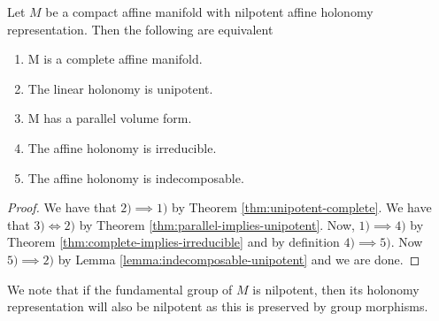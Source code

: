 \begin{theorem}
    \label{thm:complete-parallel-volume}
    Let $M$ be a compact affine manifold with nilpotent affine holonomy representation. Then the following are equivalent
    \begin{enumerate}
        \item M is a complete affine manifold.
        \item The linear holonomy is unipotent.
        \item M has a parallel volume form.
        \item The affine holonomy is irreducible.
        \item The affine holonomy is indecomposable.
    \end{enumerate}
\end{theorem}
\begin{proof}
    We have that $2) \implies 1)$ by Theorem \ref{thm:unipotent-complete}. We have that $3) \iff 2)$ by Theorem \ref{thm:parallel-implies-unipotent}.
    Now, $1) \implies 4)$ by Theorem \ref{thm:complete-implies-irreducible} and by definition $4) \implies 5)$. Now $5) \implies 2)$ by Lemma \ref{lemma:indecomposable-unipotent} and we are done.
\end{proof}
\begin{remark}
    We note that if the fundamental group of $M$ is nilpotent, then its holonomy representation will also be
    nilpotent as this is preserved by group morphisms.
\end{remark}